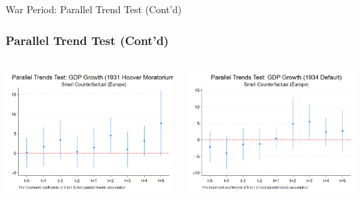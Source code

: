 \documentclass{beamer}
\begin{document}
\begin{frame}{War Period: Parallel Trend Test (Cont'd)}
  \frametitle{Parallel Trend Test (Cont'd)}
  \begin{columns}[T] %
    \begin{column}{0.45\textwidth}
      \centering
      \includegraphics[width=0.9\linewidth]{figures/PT_GDP_1931_Small.png}
    \end{column}
    \begin{column}{0.45\textwidth}
      \centering
      \includegraphics[width=0.9\linewidth]{figures/PT_GDP_1934_Small.png}
    \end{column}
  \end{columns}
\end{frame}
\end{document}

